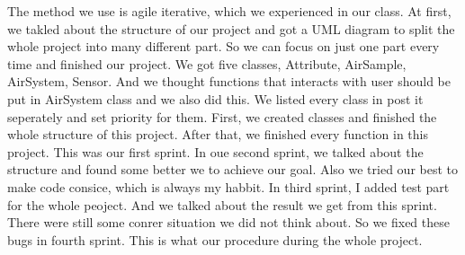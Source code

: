 \documentclass{article}
\begin{document}
The method we use is agile iterative, which we experienced in our class.
%
At first, we takled about the structure of our project and got a UML diagram to split the whole project into many different part.
%
So we can focus on just one part every time and finished our project.
%
We got five classes, Attribute, AirSample, AirSystem, Sensor.
%
And we thought functions that interacts with user should be put in AirSystem class and we also did this.
%
We listed every class in post it seperately and set priority for them.
% 
First, we created classes and finished the whole structure of this project. 
%
After that, we finished every function in this project.
%
This was our first sprint. In oue second sprint, we talked about the structure and found some better we to achieve our goal.
%
Also we tried our best to make code consice, which is always my habbit.
%
In third sprint, I added test part for the whole peoject.
%
And we talked about the result we get from this sprint.
%
There were still some conrer situation we did not think about.
%
So we fixed these bugs in fourth sprint.
%
This is what our procedure during the whole project.
\end{document}
